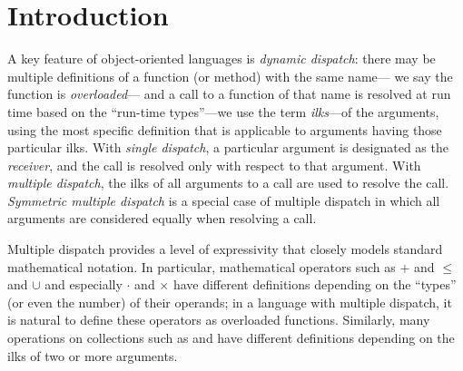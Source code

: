 \documentclass[10pt]{sigplanconf}
\newcommand{\TODO}[1]{\textbf{\emph{\textcolor{red}{TODO}}}: \textsf{\footnotesize #1}}
\begin{document}



\section{Introduction}\label{sec:intro}
A key feature of object-oriented languages is \emph{dynamic dispatch}: 
there may be multiple definitions of a function (or method) with the same name---%
we say the function is \emph{overloaded}---%
and a call to a function of that name is resolved at run time
based on the ``run-time types''---we use the term \emph{ilks}---of the arguments, 
using the most specific definition 
that is applicable to arguments having those particular ilks.
With \emph{single dispatch}, 
a particular argument is designated as the \emph{receiver}, 
and the call is resolved only with respect to that argument.
With \emph{multiple dispatch}, 
the ilks of  all arguments to a call are used to resolve the call.
\emph{Symmetric multiple dispatch} is a special case of multiple dispatch 
in which all arguments are considered equally when resolving a call.

Multiple dispatch provides a level of expressivity that closely models
standard mathematical notation.
In particular, 
mathematical operators such as $+$ and $\leq$ and $\cup$
and especially $\cdot$ and $\times$
have different definitions depending on the ``types'' (or even the number)
of their operands; 
in a language with multiple dispatch, 
it is natural to define these operators as overloaded functions. 
Similarly, 
many operations on collections such as  and  
have different definitions 
depending on the ilks of two or more arguments. 

\end{document}
